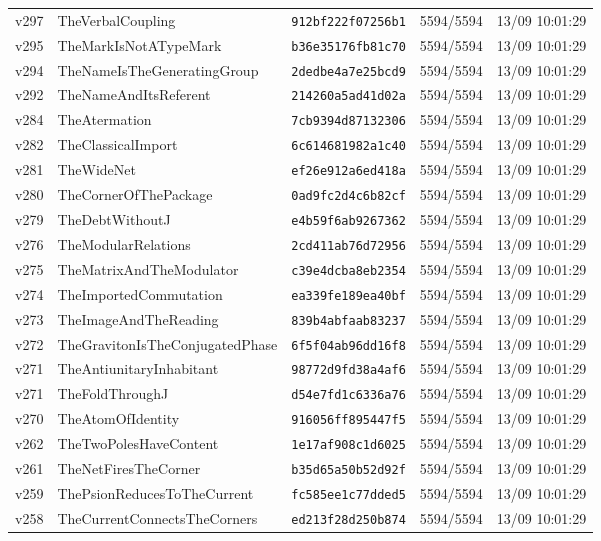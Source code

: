 \documentclass[11pt]{article}
\theoremstyle{definition}\newtheorem{deriv}{Derivação}
\begin{document}
{\begin{longtable}{@{}lllll@{}}
v297 & TheVerbalCoupling & \texttt{912bf222f07256b1} & 5594/5594 & 13/09 10:01:29 \\
v295 & TheMarkIsNotATypeMark & \texttt{b36e35176fb81c70} & 5594/5594 & 13/09 10:01:29 \\
v294 & TheNameIsTheGeneratingGroup & \texttt{2dedbe4a7e25bcd9} & 5594/5594 & 13/09 10:01:29 \\
v292 & TheNameAndItsReferent & \texttt{214260a5ad41d02a} & 5594/5594 & 13/09 10:01:29 \\
v284 & TheAtermation & \texttt{7cb9394d87132306} & 5594/5594 & 13/09 10:01:29 \\
v282 & TheClassicalImport & \texttt{6c614681982a1c40} & 5594/5594 & 13/09 10:01:29 \\
v281 & TheWideNet & \texttt{ef26e912a6ed418a} & 5594/5594 & 13/09 10:01:29 \\
v280 & TheCornerOfThePackage & \texttt{0ad9fc2d4c6b82cf} & 5594/5594 & 13/09 10:01:29 \\
v279 & TheDebtWithoutJ & \texttt{e4b59f6ab9267362} & 5594/5594 & 13/09 10:01:29 \\
v276 & TheModularRelations & \texttt{2cd411ab76d72956} & 5594/5594 & 13/09 10:01:29 \\
v275 & TheMatrixAndTheModulator & \texttt{c39e4dcba8eb2354} & 5594/5594 & 13/09 10:01:29 \\
v274 & TheImportedCommutation & \texttt{ea339fe189ea40bf} & 5594/5594 & 13/09 10:01:29 \\
v273 & TheImageAndTheReading & \texttt{839b4abfaab83237} & 5594/5594 & 13/09 10:01:29 \\
v272 & TheGravitonIsTheConjugatedPhase & \texttt{6f5f04ab96dd16f8} & 5594/5594 & 13/09 10:01:29 \\
v271 & TheAntiunitaryInhabitant & \texttt{98772d9fd38a4af6} & 5594/5594 & 13/09 10:01:29 \\
v271 & TheFoldThroughJ & \texttt{d54e7fd1c6336a76} & 5594/5594 & 13/09 10:01:29 \\
v270 & TheAtomOfIdentity & \texttt{916056ff895447f5} & 5594/5594 & 13/09 10:01:29 \\
v262 & TheTwoPolesHaveContent & \texttt{1e17af908c1d6025} & 5594/5594 & 13/09 10:01:29 \\
v261 & TheNetFiresTheCorner & \texttt{b35d65a50b52d92f} & 5594/5594 & 13/09 10:01:29 \\
v259 & ThePsionReducesToTheCurrent & \texttt{fc585ee1c77dded5} & 5594/5594 & 13/09 10:01:29 \\
v258 & TheCurrentConnectsTheCorners & \texttt{ed213f28d250b874} & 5594/5594 & 13/09 10:01:29 \\

\end{longtable}}
\end{document}
